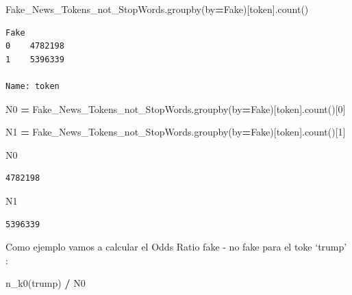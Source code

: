 \documentclass[
  11pt,
  a4paper,
]{article}
\newenvironment{Shaded}{\begin{snugshade}}{\end{snugshade}}
\newcommand{\DecValTok}[1]{\textcolor[rgb]{0.00,0.00,0.81}{#1}}
\newcommand{\NormalTok}[1]{#1}
\newcommand{\OperatorTok}[1]{\textcolor[rgb]{0.81,0.36,0.00}{\textbf{#1}}}
\newcommand{\StringTok}[1]{\textcolor[rgb]{0.31,0.60,0.02}{#1}}
\begin{document}
\begin{Shaded}
\begin{Highlighting}[]
\NormalTok{Fake\_News\_Tokens\_not\_StopWords.groupby(by}\OperatorTok{=}\StringTok{\textquotesingle{}Fake\textquotesingle{}}\NormalTok{)[}\StringTok{\textquotesingle{}token\textquotesingle{}}\NormalTok{].count()}
\end{Highlighting}
\end{Shaded}

\begin{verbatim}
Fake
0    4782198
1    5396339

Name: token
\end{verbatim}

\begin{Shaded}
\begin{Highlighting}[]
\NormalTok{N0 }\OperatorTok{=}\NormalTok{ Fake\_News\_Tokens\_not\_StopWords.groupby(by}\OperatorTok{=}\StringTok{\textquotesingle{}Fake\textquotesingle{}}\NormalTok{)[}\StringTok{\textquotesingle{}token\textquotesingle{}}\NormalTok{].count()[}\DecValTok{0}\NormalTok{]}

\NormalTok{N1 }\OperatorTok{=}\NormalTok{ Fake\_News\_Tokens\_not\_StopWords.groupby(by}\OperatorTok{=}\StringTok{\textquotesingle{}Fake\textquotesingle{}}\NormalTok{)[}\StringTok{\textquotesingle{}token\textquotesingle{}}\NormalTok{].count()[}\DecValTok{1}\NormalTok{]}
\end{Highlighting}
\end{Shaded}

\begin{Shaded}
\begin{Highlighting}[]
\NormalTok{N0}
\end{Highlighting}
\end{Shaded}

\begin{verbatim}
4782198
\end{verbatim}

\begin{Shaded}
\begin{Highlighting}[]
\NormalTok{N1}
\end{Highlighting}
\end{Shaded}

\begin{verbatim}
5396339
\end{verbatim}

Como ejemplo vamos a calcular el Odds Ratio fake - no fake para el toke
`trump' :

\begin{Shaded}
\begin{Highlighting}[]
\NormalTok{n\_k0(}\StringTok{\textquotesingle{}trump\textquotesingle{}}\NormalTok{) }\OperatorTok{/}\NormalTok{ N0 }
\end{Highlighting}
\end{Shaded}
\end{document}
